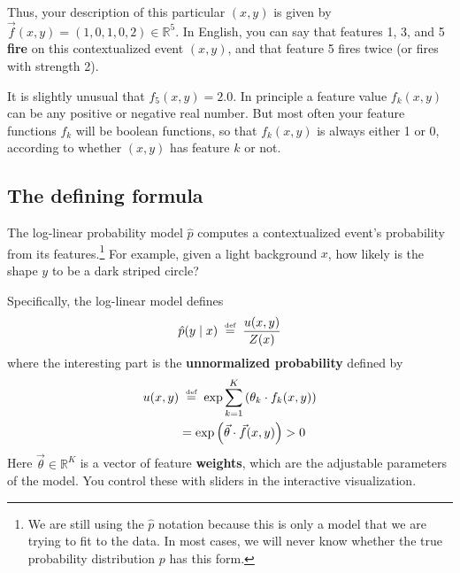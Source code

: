 \documentclass[11pt]{article}
\newcommand{\defeq}{\;\stackrel{\mbox{\tiny def}}{=}\;}
\newcommand{\vtheta}{\vec{\theta}}
\newcommand{\ph}{\hat{p}}
\newcommand{\Real}{{\mathbb R}}
\begin{document}
\noindent Thus, your description of this particular $(x,y)$ is given by
$\vec{f}(x,y)=(1,0,1,0,2) \in \Real^5$.  In English, you can say
that features 1, 3, and 5 {\bf fire} on this contextualized event
$(x,y)$, and that feature 5 fires twice (or fires with strength 2).

% 

\medskip

It is slightly unusual that $f_5(x,y)=2.0$.  In principle a feature
value $f_k(x,y)$ can be any positive or negative real number.  But
most often your feature functions $f_k$ will be boolean functions, so
that $f_k(x,y)$ is always either 1 or 0, according to whether $(x,y)$
has feature $k$ or not.



\subsection{The defining formula}\label{sec:formula}


The log-linear probability model $\ph$ computes a contextualized
event's probability from its features.\footnote{We are still using the
  $\ph$ notation because this is only a model that we are trying to
  fit to the data.  In most cases, we will never know whether the true
  probability distribution $p$ has this form.}  For example, given a
light background $x$, how likely is the shape $y$ to be a dark striped circle?

Specifically, the log-linear model defines
\begin{equation}\label{eqn:loglin}
  \ph(y \mid x) \defeq \frac{u(x,y)}{Z(x)}
\end{equation}
where the interesting part is the {\bf unnormalized probability}
defined by
\begin{align}\label{eqn:unnorm}
  u(x,y) &\defeq \exp \sum_{k=1}^K \left( \theta_k \cdot f_k(x,y) \right)  \\
         &= \exp \left(\vtheta \cdot \vec{f}(x,y)\right) > 0
\end{align}
Here $\vtheta \in \Real^K$ is a vector of feature {\bf weights}, which
are the adjustable parameters of the model.  You control these
with sliders in the interactive visualization.  
\end{document}
